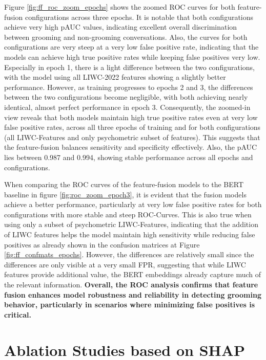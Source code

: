 Figure \ref{fig:ff_roc_zoom_epochs} shows the zoomed ROC curves for both feature-fusion configurations across three epochs. It is notable that both configurations achieve very high pAUC values, indicating excellent overall discrimination between grooming and non-grooming conversations. Also, the curves for both configurations are very steep at a very low false positive rate, indicating that the models can achieve high true positive rates while keeping false positives very low. Especially in epoch 1, there is a light difference between the two configurations, with the model using all LIWC-2022 features showing a slightly better performance. However, as training progresses to epochs 2 and 3, the differences between the two configurations become negligible, with both achieving nearly identical, almost perfect performance in epoch 3. Consequently, the zoomed-in view reveals that both models maintain high true positive rates even at very low false positive rates, across all three epochs of training and for both configurations (all LIWC-Features and only psychometric subset of features). This suggests that the feature-fusion balances sensitivity and specificity effectively. Also, the pAUC lies between 0.987 and 0.994, showing stable performance across all epochs and configurations.

When comparing the ROC curves of the feature-fusion models to the BERT baseline in figure \ref{fig:roc_zoom_epoch3}, it is evident that the fusion models achieve a  better performance, particularly at very low false positive rates for both configurations with more stable and steep ROC-Curves. This is also true when using only a subset of psychometric LIWC-Features, indicating that the addition of LIWC features helps the model maintain high sensitivity while reducing false positives as already shown in the confusion matrices at Figure \ref{fig:ff_confmats_epochs}. However, the differences are relatively small since the differences are only visible at a very small FPR, suggesting that while LIWC features provide additional value, the BERT embeddings already capture much of the relevant information. \textbf{Overall, the ROC analysis confirms that feature fusion enhances model robustness and reliability in detecting grooming behavior, particularly in scenarios where minimizing false positives is critical.} 

\section{Ablation Studies based on SHAP} \label{sec:ablation_studies_shap}

